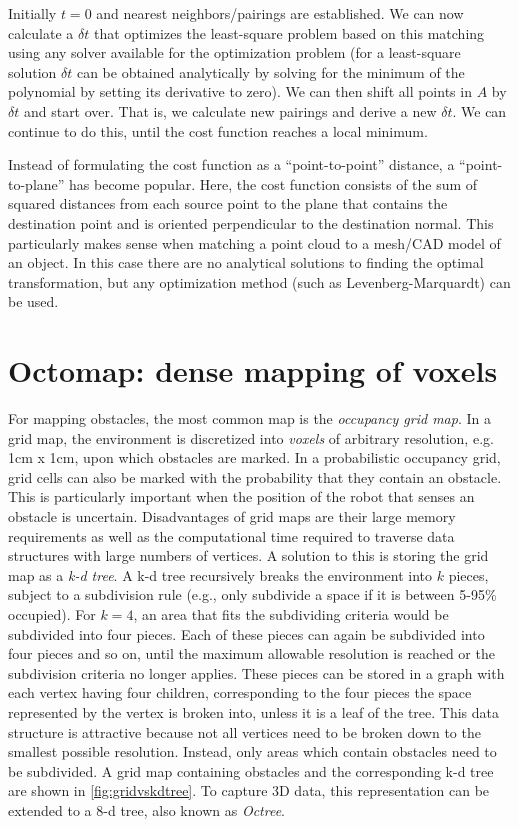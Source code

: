 Initially $t=0$ and nearest neighbors/pairings are established. We can now calculate a $ \delta t$ that optimizes the least-square problem based on this matching using any solver available for the optimization problem (for a least-square solution $ \delta t$ can be obtained analytically by solving for the minimum of the polynomial by setting its derivative to zero). We can then shift all points in $ A$ by $ \delta t$ and start over. That is, we calculate new pairings and derive a new $ \delta t$.  We can continue to do this, until the cost function reaches a local minimum.

Instead of formulating the cost function as a ``point-to-point'' distance, a ``point-to-plane'' has become popular. Here, the cost function consists of the sum of squared distances from each source point to the plane that contains the destination point and is oriented perpendicular to the destination normal. This particularly makes sense when matching a point cloud to a mesh/CAD model of an object. In this case there are no analytical solutions to finding the optimal transformation, but any optimization method (such as Levenberg-Marquardt) can be used.

\section{Octomap: dense mapping of voxels}
For mapping obstacles, the most common map is the \textsl{occupancy grid
map}. In a grid map, the environment is discretized
into \emph{voxels} of arbitrary resolution, e.g. 1cm x 1cm, upon which obstacles are
marked. In a probabilistic occupancy grid, grid cells can also be marked with
the probability that they contain an obstacle. This is particularly important
when the position of the robot that senses an obstacle is uncertain.
Disadvantages of grid maps are their large memory requirements as well as the
computational time required to traverse data structures with large numbers of
vertices. A solution to this is storing the grid map as a \textsl{k-d
tree}. A k-d tree recursively breaks the
environment into $k$ pieces, subject to a subdivision rule (e.g., only
subdivide a space if it is between 5-95\% occupied). For $k=4$, an area that
fits the subdividing criteria would be subdivided into four pieces. Each of
these pieces can again be subdivided into four pieces and so on, until the
maximum allowable resolution is reached or the subdivision criteria no longer
applies. These pieces can be stored in a graph with each vertex having four
children, corresponding to the four pieces the space represented by the vertex
is broken into, unless it is a leaf of the tree. This data structure is
attractive because not all vertices need to be broken down to the smallest
possible resolution. Instead, only areas which contain obstacles need to be
subdivided. A grid map containing obstacles and the corresponding k-d tree are
shown in \cref{fig:gridvskdtree}. To capture 3D data, this representation can
be extended to a 8-d tree, also known as \textsl{Octree}. 


